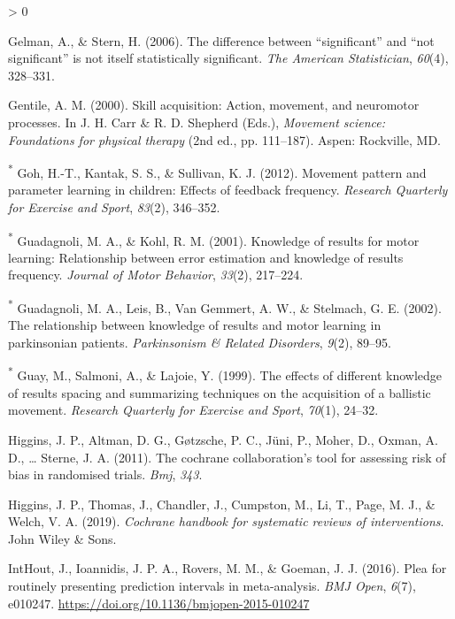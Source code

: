 \documentclass[
  english,
  man,mask,floatsintext]{apa7}
\newlength{\cslhangindent}
\newenvironment{CSLReferences}[2] %
 {%
  \setlength{\parindent}{0pt}
  \ifodd #1 \everypar{\setlength{\hangindent}{\cslhangindent}}\ignorespaces\fi
  \ifnum #2 > 0
  \setlength{\parskip}{#2\baselineskip}
  \fi
 }%
 {}
\begin{document}
\begin{CSLReferences}{1}{0}
\leavevmode\hypertarget{ref-Gelman2006}{}%
Gelman, A., \& Stern, H. (2006). The difference between {``significant''} and {``not significant''} is not itself statistically significant. \emph{The American Statistician}, \emph{60}(4), 328--331.

\leavevmode\hypertarget{ref-Gentile2000}{}%
Gentile, A. M. (2000). Skill acquisition: Action, movement, and neuromotor processes. In J. H. Carr \& R. D. Shepherd (Eds.), \emph{Movement science: Foundations for physical therapy} (2nd ed., pp. 111--187). Aspen: Rockville, MD.

\leavevmode\hypertarget{ref-Goh2012}{}%
\textsuperscript{*} Goh, H.-T., Kantak, S. S., \& Sullivan, K. J. (2012). Movement pattern and parameter learning in children: Effects of feedback frequency. \emph{Research Quarterly for Exercise and Sport}, \emph{83}(2), 346--352.

\leavevmode\hypertarget{ref-Guadagnoli2001}{}%
\textsuperscript{*} Guadagnoli, M. A., \& Kohl, R. M. (2001). Knowledge of results for motor learning: Relationship between error estimation and knowledge of results frequency. \emph{Journal of Motor Behavior}, \emph{33}(2), 217--224.

\leavevmode\hypertarget{ref-Guadagnoli2002}{}%
\textsuperscript{*} Guadagnoli, M. A., Leis, B., Van Gemmert, A. W., \& Stelmach, G. E. (2002). The relationship between knowledge of results and motor learning in parkinsonian patients. \emph{Parkinsonism \& Related Disorders}, \emph{9}(2), 89--95.

\leavevmode\hypertarget{ref-Guay1999}{}%
\textsuperscript{*} Guay, M., Salmoni, A., \& Lajoie, Y. (1999). The effects of different knowledge of results spacing and summarizing techniques on the acquisition of a ballistic movement. \emph{Research Quarterly for Exercise and Sport}, \emph{70}(1), 24--32.

\leavevmode\hypertarget{ref-Higgins2011}{}%
Higgins, J. P., Altman, D. G., Gøtzsche, P. C., Jüni, P., Moher, D., Oxman, A. D., \ldots{} Sterne, J. A. (2011). The cochrane collaboration's tool for assessing risk of bias in randomised trials. \emph{Bmj}, \emph{343}.

\leavevmode\hypertarget{ref-Higgins2019}{}%
Higgins, J. P., Thomas, J., Chandler, J., Cumpston, M., Li, T., Page, M. J., \& Welch, V. A. (2019). \emph{Cochrane handbook for systematic reviews of interventions}. John Wiley \& Sons.

\leavevmode\hypertarget{ref-IntHout2016}{}%
IntHout, J., Ioannidis, J. P. A., Rovers, M. M., \& Goeman, J. J. (2016). Plea for routinely presenting prediction intervals in meta-analysis. \emph{BMJ Open}, \emph{6}(7), e010247. \url{https://doi.org/10.1136/bmjopen-2015-010247}


\end{CSLReferences}
\end{document}
